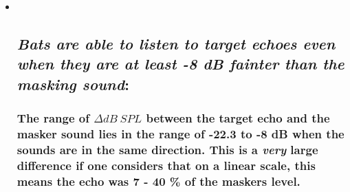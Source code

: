 \documentclass[11pt]{article}
\begin{document}
\begin{itemize}
\item ~
  \hypertarget{bats-are-able-to-listen-to-target-echoes-even-when-they-are-at-least--8-db-fainter-than-the-masking-sound}{%
  \subsection{\texorpdfstring{\emph{Bats are able to listen to target
  echoes even when they are at least -8 dB fainter than the masking
  sound}:}{Bats are able to listen to target echoes even when they are at least -8 dB fainter than the masking sound:}}\label{bats-are-able-to-listen-to-target-echoes-even-when-they-are-at-least--8-db-fainter-than-the-masking-sound}}

  \hypertarget{the-range-of-delta-db-spl-between-the-target-echo-and-the-masker-sound-lies-in-the-range-of--22.3-to--8-db-when-the-sounds-are-in-the-same-direction.-this-is-a-very-large-difference-if-one-considers-that-on-a-linear-scale-this-means-the-echo-was-7---40-of-the-maskers-level.}{%
  \subsubsection{\texorpdfstring{The range of \(\Delta dB\ SPL\) between
  the target echo and the masker sound lies in the range of -22.3 to -8
  dB when the sounds are in the same direction. This is a \emph{very}
  large difference if one considers that on a linear scale, this means
  the echo was 7 - 40 \% of the maskers
  level.}{The range of \textbackslash{}Delta dB\textbackslash{} SPL between the target echo and the masker sound lies in the range of -22.3 to -8 dB when the sounds are in the same direction. This is a very large difference if one considers that on a linear scale, this means the echo was 7 - 40 \% of the maskers level.}}\label{the-range-of-delta-db-spl-between-the-target-echo-and-the-masker-sound-lies-in-the-range-of--22.3-to--8-db-when-the-sounds-are-in-the-same-direction.-this-is-a-very-large-difference-if-one-considers-that-on-a-linear-scale-this-means-the-echo-was-7---40-of-the-maskers-level.}}

  \hypertarget{this-means-that-even-in-the-absence-of-exact-delta-db-spl-values-for-situations-where-the-echo-and-masker-arrive-from-different-directions-if-the-value-is-above--8-db-the-bat-could-hear-it.-this-is-a-conservative-estimate-because-the-co-localised-situation-is-the-toughest-for-bat-echo-perception-as-it-does-not-provide-additional-inter-aural-cues-such-as-time-of-arrival-or-level-differences.}{%
}
\end{itemize}
\end{document}
